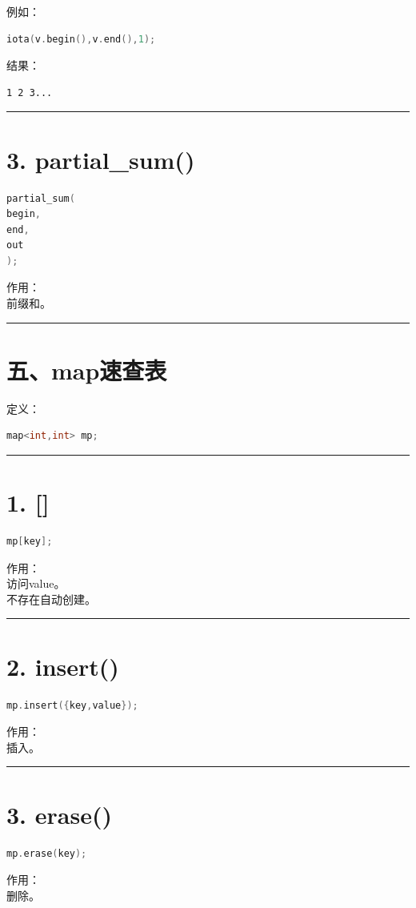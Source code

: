 \documentclass[10pt,twocolumn]{extarticle}
\begin{document}
例如：
\begin{lstlisting}[language=C++]
iota(v.begin(),v.end(),1);
\end{lstlisting}
结果：
\begin{lstlisting}
1 2 3...
\end{lstlisting}

\noindent\rule{\linewidth}{0.4pt}

\section{3. partial\_sum()}
\begin{lstlisting}[language=C++]
partial_sum(
begin,
end,
out
);
\end{lstlisting}
作用：\\
前缀和。

\noindent\rule{\linewidth}{0.4pt}

\section{五、map速查表}

定义：
\begin{lstlisting}[language=C++]
map<int,int> mp;
\end{lstlisting}

\noindent\rule{\linewidth}{0.4pt}

\section{1. []}
\begin{lstlisting}[language=C++]
mp[key];
\end{lstlisting}
作用：\\
访问value。\\
不存在自动创建。

\noindent\rule{\linewidth}{0.4pt}

\section{2. insert()}
\begin{lstlisting}[language=C++]
mp.insert({key,value});
\end{lstlisting}
作用：\\
插入。

\noindent\rule{\linewidth}{0.4pt}

\section{3. erase()}
\begin{lstlisting}[language=C++]
mp.erase(key);
\end{lstlisting}
作用：\\
删除。
\end{document}
